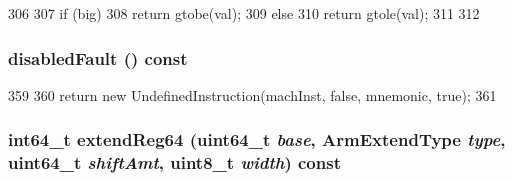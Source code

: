 \begin{DoxyCode}
306     {
307         if (big) {
308             return gtobe(val);
309         } else {
310             return gtole(val);
311         }
312     }
\end{DoxyCode}
\hypertarget{classArmISA_1_1ArmStaticInst_a620f503b160038dbe4b15bada1adb0c9}{
\subsubsection[{disabledFault}]{ disabledFault () const}}
\label{classArmISA_1_1ArmStaticInst_a620f503b160038dbe4b15bada1adb0c9}



\begin{DoxyCode}
359     {
360         return new UndefinedInstruction(machInst, false, mnemonic, true);
361     }
\end{DoxyCode}
\hypertarget{classArmISA_1_1ArmStaticInst_a1a939bcc6d227f5720f0069eabf42516}{
\subsubsection[{extendReg64}]{\setlength{\rightskip}{0pt plus 5cm}int64\_\-t extendReg64 (uint64\_\-t {\em base}, \/  {\bf ArmExtendType} {\em type}, \/  uint64\_\-t {\em shiftAmt}, \/  uint8\_\-t {\em width}) const}}
\label{classArmISA_1_1ArmStaticInst_a1a939bcc6d227f5720f0069eabf42516}



